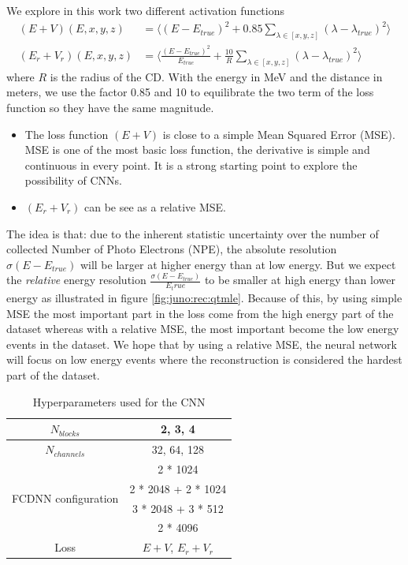 We explore in this work two different activation functions
\begin{align}
  (E+V)(E, x, y, z) &= \bigg\langle (E - E_{true})^2 + 0.85 \sum_{\lambda \in [x, y, z]} (\lambda - \lambda_{true})^2 \bigg\rangle \\
  (E_r + V_r)(E, x, y, z) &=  \bigg\langle \frac{(E - E_{true}) ^ 2}{E_{true}} + \frac{10}{R} \sum_{\lambda \in [x, y, z]} (\lambda - \lambda_{true})^2 \bigg\rangle
\end{align}
where $R$ is the radius of the CD. With the energy in MeV and the distance in meters, we use the factor 0.85 and 10 to equilibrate the two term of the loss function so they have the same magnitude.
\begin{itemize}
  \item The loss function $(E+V)$ is close to a simple Mean Squared Error (MSE). MSE is one of the most basic loss function, the derivative is simple and continuous in every point. It is a strong starting point to explore the possibility of CNNs.
  \item $(E_r + V_r)$ can be see as a relative MSE.
\end{itemize}
The idea is that: due to the inherent statistic uncertainty over the number of collected Number of Photo Electrons (NPE), the absolute resolution $\sigma (E - E_{true})$ will be larger at higher energy than at low energy. But we expect the \textit{relative} energy resolution $\frac{\sigma(E - E_{true})}{E_true}$ to be smaller at high energy than lower energy as illustrated in figure \ref{fig:juno:rec:qtmle}. Because of this, by using simple MSE the most important part in the loss come from the high energy part of the dataset whereas with a relative MSE, the most important become the low energy events in the dataset. We hope that by using a relative MSE, the neural network will focus on low energy events where the reconstruction is considered the hardest part of the dataset.


\begin{table}[ht]
  \centering
  \begin{tabular}{ | c | c | }
    \hline $N_{blocks}$ & {2, 3, 4} \\
    \hline $N_{channels}$ & {32, 64, 128} \\
    \hline
    \multirow{4}{*}{FCDNN configuration} & 2 * 1024 \\
                                        & 2 * 2048 + 2 * 1024 \\
                                        & 3 * 2048 + 3 * 512 \\
                                        & 2 * 4096 \\
    \hline
    Loss & $E+V$, $E_r + V_r$ \\
    \hline
  \end{tabular}
  \caption{Hyperparameters used for the CNN}
  \label{tab:jcnn:hyper}
\end{table}

